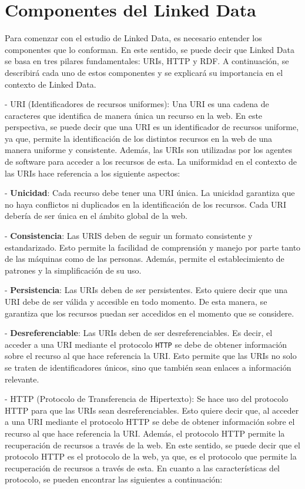 \documentclass[11pt]{report}
\begin{document}
	\chapter{Componentes del Linked Data}

	Para comenzar con el estudio de Linked Data, es necesario entender los componentes que lo conforman. En este sentido, se puede decir que Linked Data se basa en tres pilares fundamentales: URIs, HTTP y RDF. A continuación, se describirá cada uno de estos componentes y se explicará su importancia en el contexto de Linked Data.

- URI (Identificadores de recursos uniformes): Una URI es una cadena de caracteres que identifica de manera única un recurso en la web. En este perspectiva, se puede decir que una URI es un identificador de recursos uniforme, ya que, permite la identificación de los distintos recursos en la web de una manera uniforme y consistente. Además, las URIs son utilizadas por los agentes de software para acceder a los recursos de esta. La uniformidad en el contexto de las URIs hace referencia a los siguiente aspectos:

\indent \indent \indent -  \textbf{Unicidad}: Cada recurso debe tener una URI única. La unicidad garantiza que no haya conflictos ni duplicados en la identificación de los recursos. Cada URI debería de ser única en el ámbito global de la web.

\indent \indent \indent -  \textbf{Consistencia}: Las URIS deben de seguir un formato consistente y estandarizado. Esto permite la facilidad de comprensión y manejo por parte tanto de las máquinas como de las personas. Además, permite el establecimiento de patrones y la simplificación de su uso.

\indent \indent \indent -  \textbf{Persistencia}: Las URIs deben de ser persistentes. Esto quiere decir que una URI debe de ser válida y accesible en todo momento. De esta manera, se garantiza que los recursos puedan ser accedidos en el momento que se considere.

\indent \indent \indent -  \textbf{Desreferenciable}: Las URIs deben de ser desreferenciables. Es decir, el acceder a una URI mediante el protocolo \texttt{HTTP} se debe de obtener información sobre el recurso al que hace referencia la URI. Esto permite que las URIs no solo se traten de identificadores únicos, sino 	que también sean enlaces a información relevante.

- HTTP (Protocolo de Transferencia de Hipertexto): Se hace uso del protocolo HTTP para que las URIs sean desreferenciables. Esto quiere decir que, al acceder a una URI mediante el protocolo HTTP se debe de obtener información sobre el recurso al que hace referencia la URI. Además, el protocolo HTTP permite la recuperación de recursos a través de la web. En este sentido, se puede decir que el protocolo HTTP es el protocolo de la web, ya que, es el protocolo que permite la recuperación de recursos a través de esta. En cuanto a las características del protocolo, se pueden encontrar las siguientes a continuación:
\end{document}
